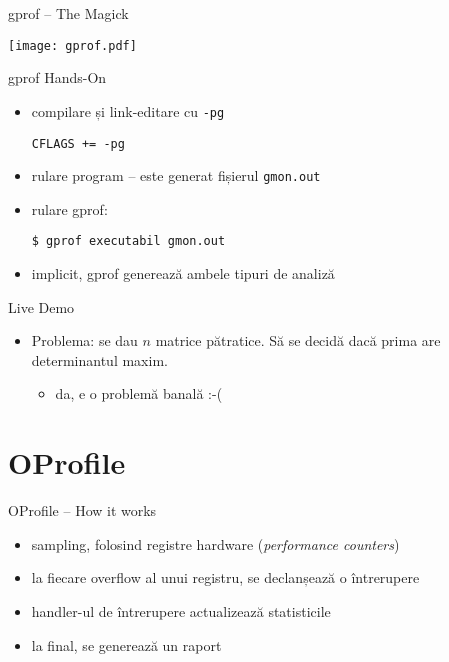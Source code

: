 \documentclass{beamer}
\begin{document}
\begin{frame}{gprof -- The Magick}
  \begin{center}
    \texttt{[image: gprof.pdf]}
  \end{center}
\end{frame}

\begin{frame}{gprof Hands-On}
  \begin{itemize}
    \item compilare și link-editare cu \texttt{-pg}

    \begin{beamerboxesrounded}[lower=block
    body,shadow=true,width=0.7\textwidth]{}
      \texttt{CFLAGS += -pg}
    \end{beamerboxesrounded}
    \item rulare program -- este generat fișierul \texttt{gmon.out}
    \item rulare gprof:

    \begin{beamerboxesrounded}[lower=block
    body,shadow=true,width=0.7\textwidth]{}
      \texttt{\$ gprof executabil gmon.out}
    \end{beamerboxesrounded}
    \item implicit, gprof generează ambele tipuri de analiză
  \end{itemize}
\end{frame}

\begin{frame}{Live Demo}
  \begin{itemize}
    \item Problema: se dau $n$ matrice pătratice. Să se decidă dacă prima are
    determinantul maxim.
    \pause
      \begin{itemize}
      \item da, e o problemă banală :-(
      \end{itemize}
  \end{itemize}
\end{frame}

\section{OProfile}
\frame{\tableofcontents[currentsection]}

\begin{frame}{OProfile -- How it works}
  \begin{itemize}
    \item sampling, folosind registre hardware (\textit{performance counters})
    \item la fiecare overflow al unui registru, se declanșează o întrerupere
    \item handler-ul de întrerupere actualizează statisticile
    \item la final, se generează un raport
  \end{itemize}
\end{frame}
\end{document}
